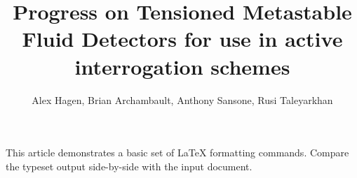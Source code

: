 

\title{Progress on Tensioned Metastable Fluid Detectors for use in active
       interrogation schemes}
\author{Alex Hagen, Brian Archambault,
        Anthony Sansone, Rusi Taleyarkhan}
\renewcommand{\today}{November 2, 1994}
\maketitle
This article demonstrates a basic set of LaTeX formatting commands.
Compare the typeset output side-by-side with the input document.

